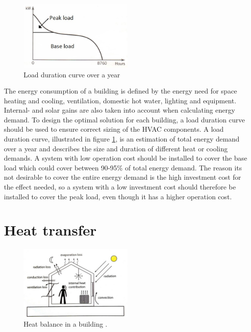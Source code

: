 \begin{figure}
    \centering
    \includegraphics[width=0.5\textwidth]{vedlegg/loaddur}
    \caption{Load duration curve over a year}
    \label{fig:ldc}
\end{figure}

The energy consumption of a building is defined by the energy need for space heating and cooling, ventilation, domestic hot water, lighting and equipment. Internal- and solar gains are also taken into account when calculating energy demand. To design the optimal solution for each building, a load duration curve should be used to ensure correct sizing of the HVAC components. A load duration curve, illustrated in figure \ref{fig:ldc}, is an estimation of total energy demand over a year and describes the size and duration of different heat or cooling demands. A system with low operation cost should be installed to cover the base load which could cover between 90-95\% of total energy demand. The reason its not desirable to cover the entire energy demand is the high investment cost for the effect needed, so a system with a low investment cost should therefore be installed to cover the peak load, even though it has a higher operation cost. 

\section{Heat transfer}
\begin{figure}
    \centering
   \vspace{5mm}
    \includegraphics[width=0.5\textwidth]{vedlegg/7281185.jpg}
    \caption{Heat balance in a building \cite{dahl}.}
    \label{fig:ccr}
\end{figure}

